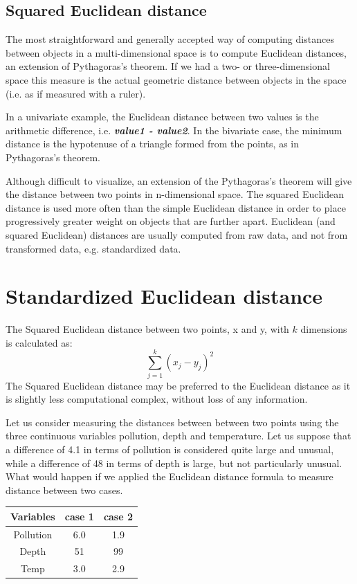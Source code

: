 \documentclass[a4paper,12pt]{article}
\begin{document}

\subsection{Squared Euclidean distance}
The most straightforward and generally accepted way of computing distances between objects in a multi-dimensional space is to compute Euclidean distances, an extension of Pythagoras's theorem.
If we had a two- or three-dimensional space this measure is the actual geometric distance between objects in the space (i.e. as if measured with a ruler).

In a univariate example, the Euclidean distance between two values is the arithmetic difference, i.e. \textbf{\textit{value1 - value2}}. In the bivariate case, the minimum distance is the hypotenuse of a triangle formed from the points, as in Pythagoras's theorem.

Although difficult to visualize, an extension of the Pythagoras's theorem will give the distance between two points in n-dimensional space. The squared Euclidean distance is used more often than the simple Euclidean distance in order to place progressively greater weight on objects that are further apart. Euclidean (and squared Euclidean) distances are usually computed from raw data, and not from transformed data, e.g. standardized data.
\section{Standardized Euclidean distance}
The Squared Euclidean distance between two points, x and y, with $k$ dimensions is calculated as:
\[ \sum^{k}_{j=1} ( x_j - y_j)^2  \]
The Squared Euclidean distance may be preferred to the Euclidean distance as it is slightly less computational complex, without loss of any information.



Let us consider measuring the distances between between two points using
the three continuous variables pollution, depth and temperature. Let us suppose that a difference of 4.1 in terms of pollution is considered quite large and unusual, while a difference of 48 in terms of depth is large, but not particularly unusual.
What would happen if we applied the Euclidean distance formula to measure distance between two cases.
\begin{center}
\begin{tabular}{|c|c|c|}
  \hline
Variables & case 1 & case 2 \\ \hline 
Pollution & 6.0 & 1.9 \\
Depth & 51 & 99 \\
Temp & 3.0 & 2.9 \\
  \hline
\end{tabular}
\end{center}
\end{document}
